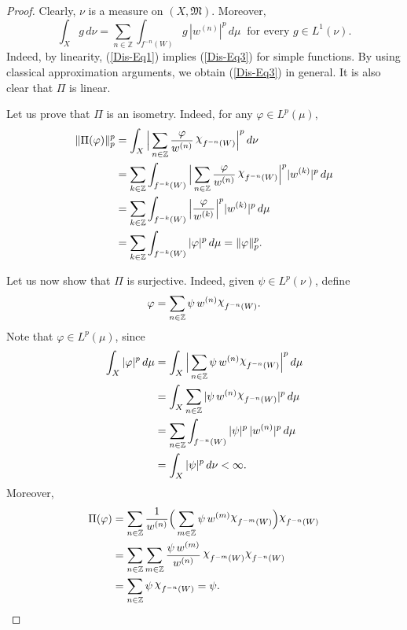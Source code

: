 \documentclass[12pt]{article}
\theoremstyle{plain}
\theoremstyle{definition}
\newcommand{\Z}{\mathbb{Z}} %
\newcommand{\fM}{\mathfrak{M}}
\DeclareRobustCommand{\rchi}{{\mathpalette\irchi\relax}}
\newcommand{\irchi}[2]{\raisebox{\depth}{$#1\chi$}}
\begin{document}
\begin{proof}
Clearly, $\nu$ is a measure on $(X,\fM)$. Moreover,
\begin{equation}\label{Dis-Eq3}
\int_X g\, d\nu = \sum_{n \in \Z} \int_{f^{-n}(W)} g\, |w^{(n)}|^p\, d\mu \ \text{ for every } g \in L^1(\nu).
\end{equation}
Indeed, by linearity, (\ref{Dis-Eq1}) implies (\ref{Dis-Eq3}) for simple functions. 
By using classical approximation arguments, we obtain (\ref{Dis-Eq3}) in general.
It is also clear that $\Pi$ is linear.

Let us prove that $\Pi$ is an isometry. Indeed, for any $\varphi \in L^p(\mu)$,
\begin{align*}
\|\Pi(\varphi)\|_{p}^{p} 
  &=\int_X \Big|\sum_{n \in \Z} \frac{\varphi}{w^{(n)}}\, \rchi_{f^{-n}(W)}\Big|^p\, d\nu \\
  &= \sum_{k \in \Z} \int_{f^{-k}(W)} \Big|\sum_{n \in \Z} \frac{\varphi}{w^{(n)}}\, \rchi_{f^{-n}(W)}\Big|^p |w^{(k)}|^p\, d\mu \\
  &= \sum_{k \in \Z} \int_{f^{-k}(W)} \Big|\frac{\varphi}{w^{(k)}}\Big|^p |w^{(k)}|^p\, d\mu \\
  &= \sum_{k \in \Z} \int_{f^{-k}(W)} |\varphi|^p\, d\mu = \|\varphi\|_{p}^{p}.
\end{align*}

Let us now show that $\Pi$ is surjective. Indeed, given $\psi \in L^p(\nu)$, define 
\[
\varphi =\sum_{n \in \Z} \psi\, w^{(n)} \rchi_{f^{-n}(W)}.
\]
Note that $\varphi \in L^p(\mu)$, since
\begin{align*}
\int_X |\varphi|^p\, d\mu
  &= \int_X \Big|\sum_{n \in \Z} \psi\, w^{(n)} \rchi_{f^{-n}(W)} \Big|^p\, d\mu \\
  &=  \int_X \sum_{n \in \Z} |\psi\, w^{(n)} \rchi_{f^{-n}(W)}|^p\, d\mu \\
  &=  \sum_{n \in \Z} \int_{f^{-n}(W)} |\psi|^p\, |w^{(n)}|^p\, d\mu \\
  &= \int_X |\psi|^p\, d\nu < \infty. 
\end{align*}
Moreover,
\begin{align*} 
\Pi(\varphi)
  &= \sum_{n \in \Z} \frac{1}{w^{(n)}} \Big(\sum_{m \in \Z} \psi\, w^{(m)} \rchi_{f^{-m}(W)}\Big) \rchi_{f^{-n}(W)} \\
  &=\sum_{n \in \Z} \sum_{m \in \Z} \frac{\psi\, w^{(m)}}{w^{(n)}}\, \rchi_{f^{-m}(W)} \rchi_{f^{-n}(W)} \\
  &= \sum_{n \in \Z} \psi\, \rchi_{f^{-n}(W)} = \psi.
\end{align*}


\end{proof}
\end{document}
